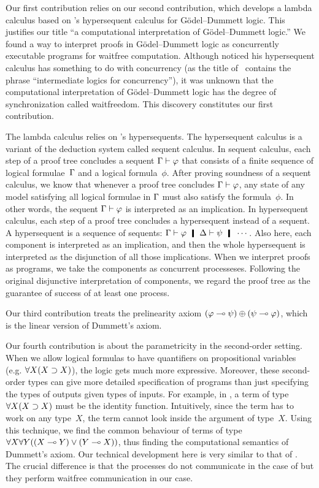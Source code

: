 Our first contribution relies on our second contribution, which
develops a lambda calculus based on \citet{avron91}'s hypersequent
calculus for G\"odel--Dummett logic.  This justifies our title ``a
computational interpretation of G\"odel--Dummett logic.''
We found a way to interpret proofs in G\"odel--Dummett logic as
concurrently executable programs for waitfree computation.
Although \citet{avron91} noticed his hypersequent calculus has something
to do with concurrency (as the title of~\citep{avron91} contains the phrase
``intermediate logics for concurrency''), it was unknown that
the computational interpretation of G\"odel--Dummett logic has
the degree of synchronization called waitfreedom.  This discovery
constitutes our first contribution.

The lambda calculus relies on \citet{avron91}'s hypersequents.
The hypersequent calculus is a
variant of the deduction system called sequent calculus.  In sequent
calculus, each step of a proof tree concludes a sequent $\Gamma\vdash\varphi$ that
consists of a finite sequence of logical formulae~$\Gamma$ and a logical
formula~$\phi$.  After proving soundness of a sequent calculus, we know
that whenever a proof tree concludes $\Gamma\vdash\varphi$, any state of any model
satisfying all logical formulae in $\Gamma$ must also satisfy the
formula~$\phi$.  In other words, the sequent $\Gamma\vdash\varphi$ is
interpreted as an implication.  In hypersequent calculus, each step of a
proof tree concludes a hypersequent instead of a sequent.  A
hypersequent is a sequence of sequents: $\G\vdash\phi\hmid \D\vdash\psi
\hmid \cdots$.  Also here, each component is interpreted as an
implication, and then the whole hypersequent is interpreted as the
disjunction of all those implications.
When we interpret proofs as programs, we take the components as
concurrent processeses.  Following the original disjunctive
interpretation of components, we regard the proof tree as the guarantee of
success of at least one process.

Our third contribution treats the prelinearity axiom
$(\varphi\multimap\psi)\oplus(\psi\multimap\varphi)$, which is the linear version of
Dummett's axiom.

Our fourth contribution is about the parametricity in the second-order
setting.  When we allow logical formulas to have quantifiers on
propositional variables (e.g. $\forall X(X\supset X)$), the logic gets much
more expressive.
Moreover, these second-order types can give more detailed specification
of programs than just specifying the types of outputs given types of
inputs.
For example, in , a term of type $\forall X(X\supset X)$
must be the identity function.
Intuitively, since the term has to work on any type~$X$, the term cannot
look inside the argument of type~$X$.
Using this technique, we find the common behaviour of terms of type
$\forall X \forall Y ((X\multimap Y)\lor (Y\multimap X))$, thus finding the
computational semantics of Dummett's axiom.
Our technical development here is very similar to that of
\citet{danos-krivine}.  The crucial difference is that the processes do
not communicate in the case of \citet{danos-krivine} but they perform
waitfree communication in our case.


